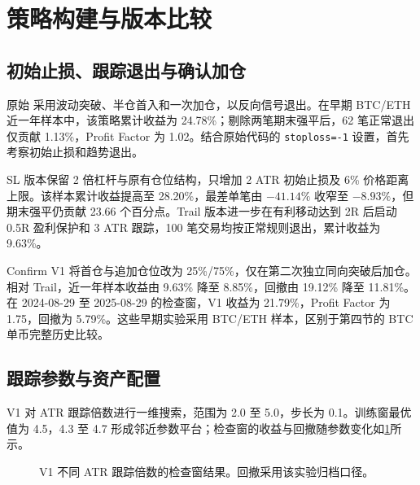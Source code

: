 \section{策略构建与版本比较}

\subsection{初始止损、跟踪退出与确认加仓}

原始 \Original 采用波动突破、半仓首入和一次加仓，以反向信号退出。在早期 BTC/ETH 近一年样本中，该策略累计收益为 24.78\%；剔除两笔期末强平后，62 笔正常退出仅贡献 1.13\%，Profit Factor 为 1.02。结合原始代码的 \texttt{stoploss=-1} 设置，首先考察初始止损和趋势退出。

SL 版本保留 2 倍杠杆与原有仓位结构，只增加 2 ATR 初始止损及 6\% 价格距离上限。该样本累计收益提高至 28.20\%，最差单笔由 $-41.14\%$ 收窄至 $-8.93\%$，但期末强平仍贡献 23.66 个百分点。Trail 版本进一步在有利移动达到 2R 后启动 0.5R 盈利保护和 3 ATR 跟踪，100 笔交易均按正常规则退出，累计收益为 9.63\%。

Confirm V1 将首仓与追加仓位改为 25\%/75\%，仅在第二次独立同向突破后加仓。相对 Trail，近一年样本收益由 9.63\% 降至 8.85\%，回撤由 19.12\% 降至 11.81\%。在 2024-08-29 至 2025-08-29 的检查窗，V1 收益为 21.79\%，Profit Factor 为 1.75，回撤为 5.79\%。这些早期实验采用 BTC/ETH 样本，区别于第四节的 BTC 单币完整历史比较。

\subsection{跟踪参数与资产配置}

V1 对 ATR 跟踪倍数进行一维搜索，范围为 2.0 至 5.0，步长为 0.1。训练窗最优值为 4.5，4.3 至 4.7 形成邻近参数平台；检查窗的收益与回撤随参数变化如\cref{fig:trail-platform}所示。

\begin{figure}[H]
  \centering
  \caption{V1 不同 ATR 跟踪倍数的检查窗结果。回撤采用该实验归档口径。}
  \label{fig:trail-platform}
\end{figure}

